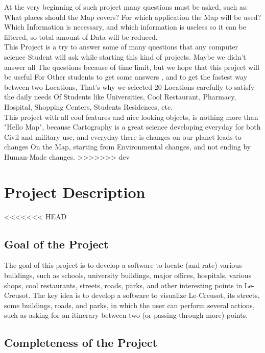 \documentclass[a4paper, 12pt, english]{book}
\begin{document}
At the very beginning of such project many questions must be asked, such as: 
What places should the Map covers? For which application the Map will be used?
Which Information is necessary, and which information is useless so it can be 
filtered, so total amount of Data will be reduced.\\

This Project is a try to answer some of many questions that any computer 
science Student will ask while starting this kind of projects. Maybe we 
didn't answer all The questions because of time limit, but we hope that 
this project will be useful For Other students to get some answers , and 
to get the fastest way between two Locations, That's why we selected 20 
Locations carefully to satisfy the daily needs Of Students like Universities, 
Cool Restaurant, Pharmacy, Hospital, Shopping Centers, Students Residences, etc.\\

This project with all cool features and nice looking objects, is nothing more 
than "Hello Map", because Cartography is a great science developing everyday 
for both Civil and military use, and everyday there is changes on our planet 
leads to changes On the Map, starting from Environmental changes, and not ending 
by Human-Made changes. 
>>>>>>> dev

\chapter{Project Description}
<<<<<<< HEAD
\section{Goal of the Project}
The goal of this project is to develop a software to locate (and rate) various buildings, such as schools, university buildings, major offices, hospitals, various shops, cool restaurants, streets, roads, parks, and other interesting points in Le-Creusot.
The key idea is to develop a software to visualize Le-Creusot, its streets, some
buildings, roads, and parks, in which the user can perform several actions, such as asking for an itinerary between two (or passing through more) points.
\section{Completeness of the Project}
\end{document}

